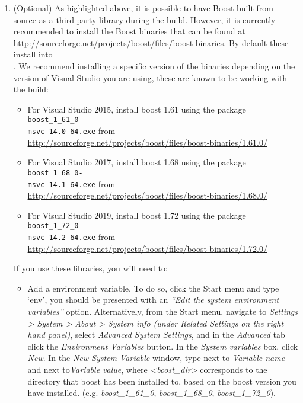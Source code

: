 \begin{enumerate}
  \item (Optional) As highlighted above, it is possible to have Boost built
  from source as a third-party library during the \nekpp build. However, it
  is currently recommended to install the Boost binaries that can be found at
  \url{http://sourceforge.net/projects/boost/files/boost-binaries}. By
  default these install into \\ . We recommend installing a specific version of the
    binaries depending on the version of Visual Studio you are using, 
    these are known to be working with the \nekpp build:
  \begin{itemize}
  	\item For Visual Studio 2015, install boost 1.61 using the package
	 \texttt{boost\_1\_61\_0-\\msvc-14.0-64.exe} from \url{http://sourceforge.net/projects/boost/files/boost-binaries/1.61.0/}
  	\item For Visual Studio 2017, install boost 1.68 using the package
	 \texttt{boost\_1\_68\_0-\\msvc-14.1-64.exe} from \url{http://sourceforge.net/projects/boost/files/boost-binaries/1.68.0/}
  	\item For Visual Studio 2019, install boost 1.72 using the package
	 \texttt{boost\_1\_72\_0-\\msvc-14.2-64.exe}  from \url{http://sourceforge.net/projects/boost/files/boost-binaries/1.72.0/}
  \end{itemize}  
  If you use these libraries, you will need to:
  \begin{itemize}
  	\item Add a  environment variable. To do so, click the
	Start menu and type `env', you should be presented with an \emph{``Edit
  the system environment variables''} option. Alternatively, from the Start
  menu, navigate to \emph{Settings > System > About > System info 
	(under Related Settings on the right hand panel)}, select
	\emph{Advanced System Settings}, and in the \emph{Advanced} tab click the
	\emph{Environment Variables} button. In the \emph{System variables} box,
  click \emph{New}. In the \emph{New System Variable} window, type
   next to \emph{Variable name} and 
   next to\emph{Variable value}, where \emph{<boost\_dir>}
  corresponds to the directory that boost has been installed to, based on the
  boost version you have installed. (e.g. \emph{boost\_1\_61\_0},
  \emph{boost\_1\_68\_0}, \emph{boost\_1\_72\_0}).


\end{itemize}
\end{enumerate}
